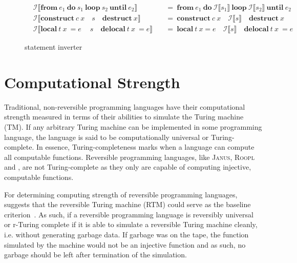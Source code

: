 \begin{figure}[ht]
\begin{align*}
        &\mathcal{I} \llbracket \textbf{from}\ e_1\ \textbf{do}\ s_1\ \textbf{loop}\ s_2\ \textbf{until}\ e_2 \rrbracket\ &&=\ \textbf{from}\ e_1\ \textbf{do}\ \mathcal{I}\llbracket s_1 \rrbracket\ \textbf{loop}\ \mathcal{I}\llbracket s_2 \rrbracket\ \textbf{until}\ e_2\\
        &\mathcal{I} \llbracket\textbf{construct}\ c\ x\quad s\quad \textbf{destruct}\ x\rrbracket\ &&=\ \textbf{construct}\ c\ x\quad\mathcal{I}\llbracket s \rrbracket\quad\textbf{destruct}\ x\\
        &\mathcal{I} \llbracket\textbf{local}\ t\ x\ = e\ \quad s\quad \textbf{delocal}\ t\ x\ = e\rrbracket\ &&=\ \textbf{local}\ t\ x = e \quad\mathcal{I}\llbracket s \rrbracket\quad\textbf{delocal}\ t\ x\ = e
    \end{align*}
    \caption{\rooplpp statement inverter}
    \label{fig:statement-inverter}
\end{figure}

\section{Computational Strength}
\label{sec:computational-strength}
Traditional, non-reversible programming languages have their computational strength measured in terms of their abilities to simulate the Turing machine (TM). If any arbitrary Turing machine can be implemented in some programming language, the language is said to be computationally universal or Turing-complete. In essence, Turing-completeness marks when a language can compute all computable functions. Reversible programming languages, like \textsc{Janus}, \textsc{Roopl} and \rooplpp, are not Turing-complete as they only are capable of computing injective, computable functions.

For determining computing strength of reversible programming languages,~\citeauthor{ty:ejanus} suggests that the reversible Turing machine (RTM) could serve as the baseline criterion~\cite{ty:ejanus}. As such, if a reversible programming language is reversibly universal or r-Turing complete if it is able to simulate a reversible Turing machine cleanly, i.e. without generating garbage data. If garbage was on the tape, the function simulated by the machine would not be an injective function and as such, no garbage should be left after termination of the simulation.

